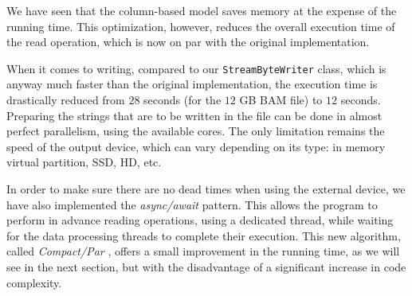 \documentclass[a4paper,twoside]{article}
\begin{document}
We have seen that the column-based model saves memory at the expense of the running time.
This optimization, however, reduces the overall execution time of the read operation, which is now on par with the original implementation.

When it comes to writing, compared to our {\texttt{StreamByteWriter} } class, which is anyway much faster than the original implementation, the execution time is drastically reduced from $28$ seconds (for the $12$ GB BAM file) to $12$ seconds.
Preparing the strings that are to be written in the file can be done in almost perfect parallelism, using the available cores.
The only limitation remains the speed of the output device, which can vary depending on its type: in memory virtual partition, SSD, HD, etc.
	
In order to make sure there are no dead times when using the external device, 
we have also implemented the {\textit{async/await} } pattern.
This allows the program to perform in advance reading operations, using a dedicated thread, while waiting for the data processing threads to complete their execution.
This new algorithm, called {\textit{Compact/Par} }, offers a small improvement in the running time, as we will see in the next section, but with the disadvantage of a significant increase in code complexity.
\end{document}
